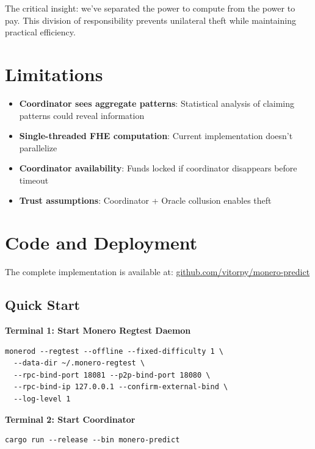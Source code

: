 \documentclass{article}
\begin{document}
The critical insight: we've separated the power to compute from the power to pay. This division of responsibility prevents unilateral theft while maintaining practical efficiency.

\section{Limitations}

\begin{itemize}
\item \textbf{Coordinator sees aggregate patterns}: Statistical analysis of claiming patterns could reveal information

\item \textbf{Single-threaded FHE computation}: Current implementation doesn't parallelize

\item \textbf{Coordinator availability}: Funds locked if coordinator disappears before timeout

\item \textbf{Trust assumptions}: Coordinator + Oracle collusion enables theft

\end{itemize}

\section{Code and Deployment}

The complete implementation is available at: \href{https://github.com/vitorpy/monero-predict}{github.com/vitorpy/monero-predict}

\subsection{Quick Start}

\textbf{Terminal 1: Start Monero Regtest Daemon}

\begin{verbatim}
monerod --regtest --offline --fixed-difficulty 1 \
  --data-dir ~/.monero-regtest \
  --rpc-bind-port 18081 --p2p-bind-port 18080 \
  --rpc-bind-ip 127.0.0.1 --confirm-external-bind \
  --log-level 1
\end{verbatim}

\textbf{Terminal 2: Start Coordinator}

\begin{verbatim}
cargo run --release --bin monero-predict
\end{verbatim}
\end{document}
